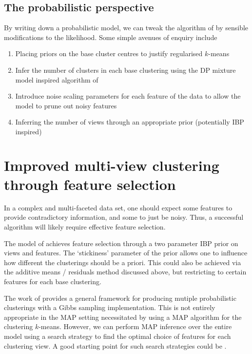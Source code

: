 \documentclass{article}
\numberwithin{equation}{section}
\numberwithin{thm}{section}
\begin{document}
\subsection{The probabilistic perspective}

By writing down a probabilistic model, we can tweak the algorithm of \cite{Cui2007} by sensible modifications to the likelihood.
Some simple avenues of enquiry include
\begin{enumerate}
\item Placing priors on the base cluster centres to justify regularised $k$-means \citep[e.g.][]{Sun2012}
\item Infer the number of clusters in each base clustering using the DP mixture model inspired algorithm of \cite{Kulis2012}
\item Introduce noise scaling parameters for each feature of the data to allow the model to prune out noisy features
\item Inferring the number of views through an appropriate prior (potentially IBP inspired)
\end{enumerate}

\section{Improved multi-view clustering through feature selection}

In a complex and multi-faceted data set, one should expect some features to provide contradictory information, and some to just be noisy.
Thus, a successful algorithm will likely require effective feature selection.

The model of \citep{Niu2012} achieves feature selection through a two parameter IBP prior on views and features.
The `stickiness' parameter of the prior allows one to influence how different the clusterings should be a priori.
This could also be achieved via the additive means / residuals method discussed above, but restricting to certain features for each base clustering.

The work of \citep{Niu2012} provides a general framework for producing mutiple probabilistic clusterings with a Gibbs sampling implementation.
This is not entirely appropriate in the MAP setting necessitated by using a MAP algorithm for the clustering \ie $k$-means.
However, we can perform MAP inference over the entire model using a search strategy to find the optimal choice of features for each clustering view.
A good starting point for such search strategies could be \cite{Dy2004}.
\end{document}
